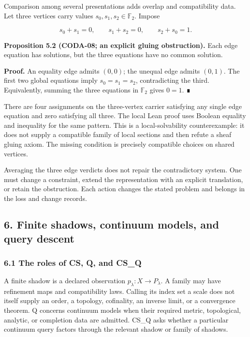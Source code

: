 \documentclass[
  11pt,
]{article}
\begin{document}
Comparison among several presentations adds overlap and compatibility data. Let three vertices carry values \(s_0,s_1,s_2\in\mathbb F_2\). Impose

\[
 s_0+s_1=0,\qquad s_1+s_2=0,\qquad s_2+s_0=1.
\]

\textbf{Proposition 5.2 (CODA-08; an explicit gluing obstruction).} Each edge equation has solutions, but the three equations have no common solution.

\textbf{Proof.} An equality edge admits \((0,0)\); the unequal edge admits \((0,1)\). The first two global equations imply \(s_0=s_1=s_2\), contradicting the third. Equivalently, summing the three equations in \(\mathbb F_2\) gives \(0=1\). ∎

There are four assignments on the three-vertex carrier satisfying any single edge equation and zero satisfying all three. The local Lean proof uses Boolean equality and inequality for the same pattern. This is a local-solvability counterexample: it does not supply a compatible family of local sections and then refute a sheaf gluing axiom. The missing condition is precisely compatible choices on shared vertices.

Averaging the three edge verdicts does not repair the contradictory system. One must change a constraint, extend the representation with an explicit translation, or retain the obstruction. Each action changes the stated problem and belongs in the loss and change records.

\subsection{6. Finite shadows, continuum models, and query descent}\label{finite-shadows-continuum-models-and-query-descent}

\subsubsection{6.1 The roles of CS, Q, and CS\_Q}\label{the-roles-of-cs-q-and-cs_q}

A finite shadow is a declared observation \(p_\lambda:X\to P_\lambda\). A family may have refinement maps and compatibility laws. Calling its index set a scale does not itself supply an order, a topology, cofinality, an inverse limit, or a convergence theorem. Q concerns continuum models when their required metric, topological, analytic, or completion data are admitted. CS\_Q asks whether a particular continuum query factors through the relevant shadow or family of shadows.
\end{document}
